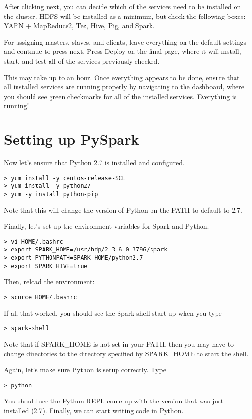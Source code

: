 \documentclass[9pt,twocolumn,twoside]{idsi}
\begin{document}
After clicking next, you can decide which of the services need to be installed on the cluster. HDFS will be installed as a minimum, but check the following boxes: YARN + MapReduce2, Tez, Hive, Pig, and Spark.

For assigning masters, slaves, and clients, leave everything on the default settings and continue to press next. Press Deploy on the final page, where it will install, start, and test all of the services previously checked. 

This may take up to an hour. Once everything appears to be done, ensure that all installed services are running properly by navigating to the dashboard, where you should see green checkmarks for all of the installed services. Everything is running!

\section{Setting up PySpark}

Now let's ensure that Python 2.7 is installed and configured.
\begin{verbatim}
> yum install -y centos-release-SCL
> yum install -y python27
> yum -y install python-pip
\end{verbatim}
Note that this will change the version of Python on the PATH to default to 2.7.

\noindent
Finally, let's set up the environment variables for Spark and Python.
\begin{verbatim}
> vi HOME/.bashrc
> export SPARK_HOME=/usr/hdp/2.3.6.0-3796/spark
> export PYTHONPATH=SPARK_HOME/python2.7
> export SPARK_HIVE=true
\end{verbatim}

\noindent
Then, reload the environment:
\begin{verbatim}
> source HOME/.bashrc
\end{verbatim}

If all that worked, you should see the Spark shell start up when you type
\begin{verbatim}
> spark-shell
\end{verbatim}

Note that if SPARK\_HOME is not set in your PATH, then you may have to change directories to the directory specified by SPARK\_HOME to start the shell.

Again, let's make sure Python is setup correctly. Type
\begin{verbatim}
> python
\end{verbatim}
You should see the Python REPL come up with the version that was just installed (2.7). Finally, we can start writing code in Python.
\end{document}
